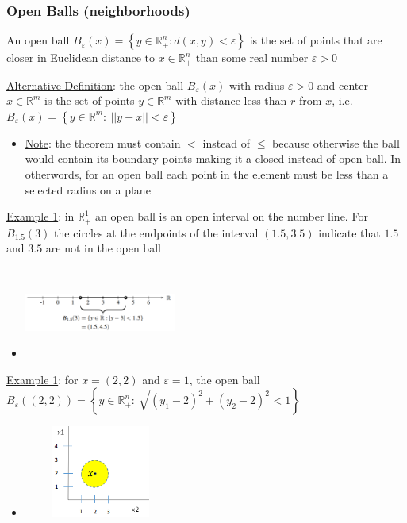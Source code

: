 \documentclass{article}
\begin{document}
\subsubsection{Open Balls (neighborhoods)}
An open ball $B_{\varepsilon}(x) = \left\{ y \in \mathbb{R}_{+}^{n}: d(x,y) < \varepsilon \right\}$ is the set of points that are closer in Euclidean distance to $x \in \mathbb{R}_{+}^{n}$ than some real number $\varepsilon > 0$ \par \vspace{0.3em}
  \underline{Alternative Definition}: the open ball $B_{\varepsilon}(x)$ with radius $\varepsilon > 0$ and center $x \in \mathbb{R}^{m}$ is the set of points $y \in \mathbb{R}^{m}$ with distance less than $r$ from $x$, i.e. $B_{\varepsilon}(x) = \left\{ y \in \mathbb{R}^{m}: \ ||y - x|| < \varepsilon \right\}$
  \begin{itemize}
    \item  \underline{Note}: the theorem must contain $<$ instead of $\leq$ because otherwise the ball would contain its boundary points making it a closed instead of open ball. In otherwords, for an open ball each point in the element must be less than a selected radius on a plane
  \end{itemize}
  \par
  \underline{Example 1}: in $\mathbb{R}_{+}^{1}$ an open ball is an open interval on the number line. For $B_{1.5}(3)$ the circles at the endpoints of the interval $(1.5, 3.5)$ indicate that $1.5$ and $3.5$ are not in the open ball
  \begin{itemize}
    \item  \includegraphics[width=5cm, height=3cm]{pic2}
  \end{itemize}
  \par
  \underline{Example 1}: for $x = (2,2)$ and $\varepsilon = 1$, the open ball $B_{\varepsilon}((2,2)) = \left\{ y \in \mathbb{R}^{n}_{+}: \ \sqrt{(y_{1} - 2)^{2} + (y_{2} - 2)^{2}} < 1 \right\}$
  \begin{itemize}
    \item  \includegraphics[width=5cm, height=3cm]{pic3}
  \end{itemize}
  \par
\vspace{6mm}
\end{document}
